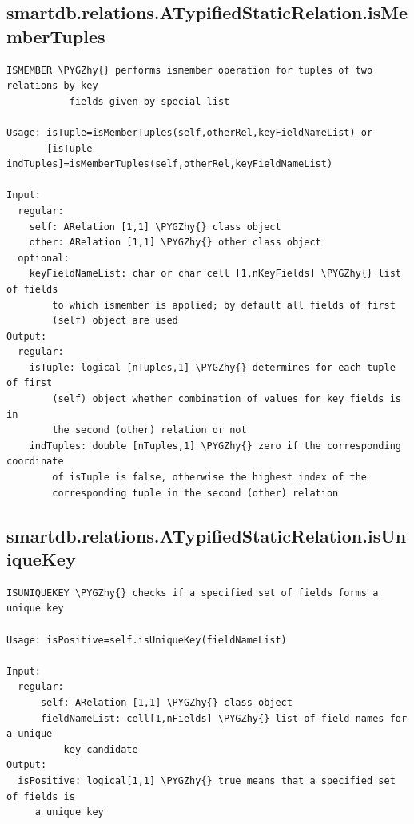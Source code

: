 \documentclass[letterpaper,10pt,english]{sphinxmanual}
\def\PYGZhy{\char`\-}
\begin{document}
\subsection{smartdb.relations.ATypifiedStaticRelation.isMemberTuples}
\label{chap_functions:smartdb-relations-atypifiedstaticrelation-ismembertuples}
\begin{Verbatim}[commandchars=\\\{\}]
ISMEMBER \PYGZhy{} performs ismember operation for tuples of two relations by key
           fields given by special list

Usage: isTuple=isMemberTuples(self,otherRel,keyFieldNameList) or
       [isTuple indTuples]=isMemberTuples(self,otherRel,keyFieldNameList)

Input:
  regular:
    self: ARelation [1,1] \PYGZhy{} class object
    other: ARelation [1,1] \PYGZhy{} other class object
  optional:
    keyFieldNameList: char or char cell [1,nKeyFields] \PYGZhy{} list of fields
        to which ismember is applied; by default all fields of first
        (self) object are used
Output:
  regular:
    isTuple: logical [nTuples,1] \PYGZhy{} determines for each tuple of first
        (self) object whether combination of values for key fields is in
        the second (other) relation or not
    indTuples: double [nTuples,1] \PYGZhy{} zero if the corresponding coordinate
        of isTuple is false, otherwise the highest index of the
        corresponding tuple in the second (other) relation
\end{Verbatim}


\subsection{smartdb.relations.ATypifiedStaticRelation.isUniqueKey}
\label{chap_functions:smartdb-relations-atypifiedstaticrelation-isuniquekey}
\begin{Verbatim}[commandchars=\\\{\}]
ISUNIQUEKEY \PYGZhy{} checks if a specified set of fields forms a unique key

Usage: isPositive=self.isUniqueKey(fieldNameList)

Input:
  regular:
      self: ARelation [1,1] \PYGZhy{} class object
      fieldNameList: cell[1,nFields] \PYGZhy{} list of field names for a unique
          key candidate
Output:
  isPositive: logical[1,1] \PYGZhy{} true means that a specified set of fields is
     a unique key
\end{Verbatim}
\end{document}
